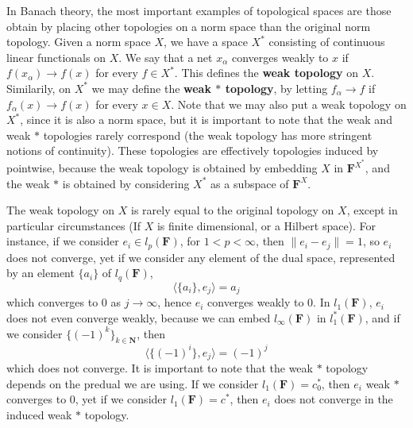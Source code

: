 \begin{example}
    In Banach theory, the most important examples of topological spaces are those obtain by placing other topologies on a norm space than the original norm topology. Given a norm space $X$, we have a space $X^*$ consisting of continuous linear functionals on $X$. We say that a net $x_\alpha$ converges weakly to $x$ if $f(x_\alpha) \to f(x)$ for every $f \in X^*$. This defines the {\bf weak topology} on $X$. Similarily, on $X^*$ we may define the {\bf weak $*$ topology}, by letting $f_\alpha \to f$ if $f_\alpha(x) \to f(x)$ for every $x \in X$. Note that we may also put a weak topology on $X^*$, since it is also a norm space, but it is important to note that the weak and weak $*$ topologies rarely correspond (the weak topology has more stringent notions of continuity). These topologies are effectively topologies induced by pointwise, because the weak topology is obtained by embedding $X$ in $\mathbf{F}^{X^*}$, and the weak $*$ is obtained by considering $X^*$ as a subspace of $\mathbf{F}^X$.

    The weak topology on $X$ is rarely equal to the original topology on $X$, except in particular circumstances (If $X$ is finite dimensional, or a Hilbert space). For instance, if we consider $e_i \in l_p(\mathbf{F})$, for $1 < p < \infty$, then $\| e_i - e_j \| = 1$, so $e_i$ does not converge, yet if we consider any element of the dual space, represented by an element $\{ a_i \}$ of $l_q(\mathbf{F})$,
    \[ \langle \{ a_i \}, e_j \rangle = a_j \]
    which converges to 0 as $j \to \infty$, hence $e_i$ converges weakly to 0. In $l_1(\mathbf{F})$, $e_i$ does not even converge weakly, because we can embed $l_\infty(\mathbf{F})$ in $l^*_1(\mathbf{F})$, and if we consider $\{ (-1)^k \}_{k \in \mathbf{N}}$, then
    \[ \langle \{ (-1)^i \}, e_j \rangle = (-1)^j \]
    which does not converge. It is important to note that the weak $*$ topology depends on the predual we are using. If we consider $l_1(\mathbf{F}) = c_0^*$, then $e_i$ weak $*$ converges to 0, yet if we consider $l_1(\mathbf{F}) = c^*$, then $e_i$ does not converge in the induced weak $*$ topology.


\end{example}
